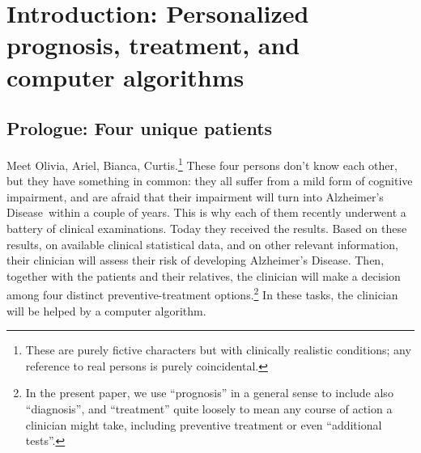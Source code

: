 \documentclass[utf8]{FrontiersinHarvard} %
\renewcommand*{\|}[1][]{\nonscript\:#1\vert\nonscript\:\mathopen{}}
\newcommand*{\ad}{Alzheimer's Disease}
\begin{document}
\newpage
\section{Introduction: Personalized prognosis, treatment, and computer algorithms}
\label{sec:intro}

\setcounter{subsection}{-1}
\subsection{Prologue: Four unique patients} %
\label{sec:four_patients}

Meet Olivia, Ariel, Bianca, Curtis.\footnote{These are purely fictive characters but with clinically realistic conditions; any reference to real persons is purely coincidental.}
These four persons don't know each other, but they have something in common: they all suffer from a mild form of cognitive impairment, and are afraid that their impairment will turn into \ad\ within a couple of years. This is why each of them recently underwent a battery %
of clinical examinations. Today they received the results. Based on these results, on available clinical statistical data, and on other relevant information, their clinician will 
assess their risk of developing \ad. Then, together with the patients and their relatives, the clinician will make a decision among four distinct preventive-treatment options.\footnote{In the present paper, we use \enquote{prognosis} in a general sense to include also \enquote{diagnosis}, and \enquote{treatment} quite loosely to mean any course of action a clinician might take, including preventive treatment or even \enquote{additional tests}.} In these tasks, the clinician will be helped by a computer algorithm.
\end{document}
